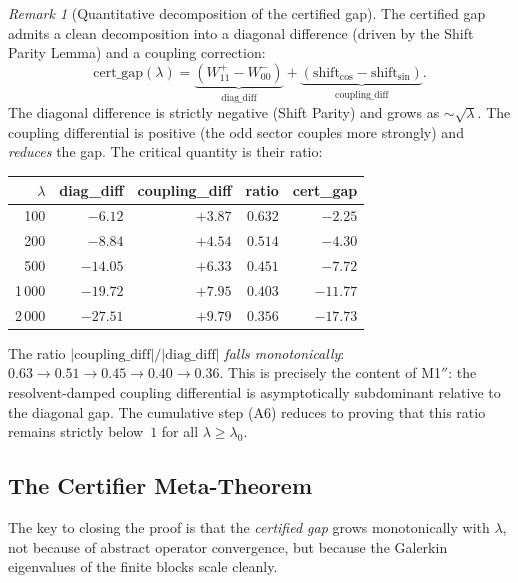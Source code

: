 \documentclass[12pt,a4paper]{article}
\theoremstyle{definition}
\theoremstyle{remark}
\newtheorem{remark}[theorem]{Remark}
\begin{document}
\begin{remark}[Quantitative decomposition of the certified gap]
\label{rem:gap-decomposition}
The certified gap admits a clean decomposition into a diagonal difference (driven by the Shift Parity Lemma) and a coupling correction:
\[
  \mathrm{cert\_gap}(\lambda) = \underbrace{(W_{11}^+ - W_{00}^-)}_{\text{diag\_diff}} + \underbrace{(\text{shift}_{\cos} - \text{shift}_{\sin})}_{\text{coupling\_diff}}.
\]
The diagonal difference is strictly negative (Shift Parity) and grows as $\sim\!\sqrt{\lambda}$. The coupling differential is positive (the odd sector couples more strongly) and \emph{reduces} the gap. The critical quantity is their ratio:

\begin{center}
\small
\begin{tabular}{r|r|r|r|r}
$\lambda$ & diag\_diff & coupling\_diff & ratio & cert\_gap \\\hline
100 & $-6.12$ & $+3.87$ & $0.632$ & $-2.25$ \\
200 & $-8.84$ & $+4.54$ & $0.514$ & $-4.30$ \\
500 & $-14.05$ & $+6.33$ & $0.451$ & $-7.72$ \\
1\,000 & $-19.72$ & $+7.95$ & $0.403$ & $-11.77$ \\
2\,000 & $-27.51$ & $+9.79$ & $0.356$ & $-17.73$
\end{tabular}
\end{center}

\noindent The ratio $|\text{coupling\_diff}|/|\text{diag\_diff}|$ \emph{falls monotonically}: $0.63 \to 0.51 \to 0.45 \to 0.40 \to 0.36$. This is precisely the content of M1$''$: the resolvent-damped coupling differential is asymptotically subdominant relative to the diagonal gap. The cumulative step (A6) reduces to proving that this ratio remains strictly below~$1$ for all $\lambda \geq \lambda_0$.
\end{remark}

\subsection{The Certifier Meta-Theorem}
\label{sec:meta-theorem}

The key to closing the proof is that the \emph{certified gap} grows monotonically with $\lambda$, not because of abstract operator convergence, but because the Galerkin eigenvalues of the finite blocks scale cleanly.
\end{document}
